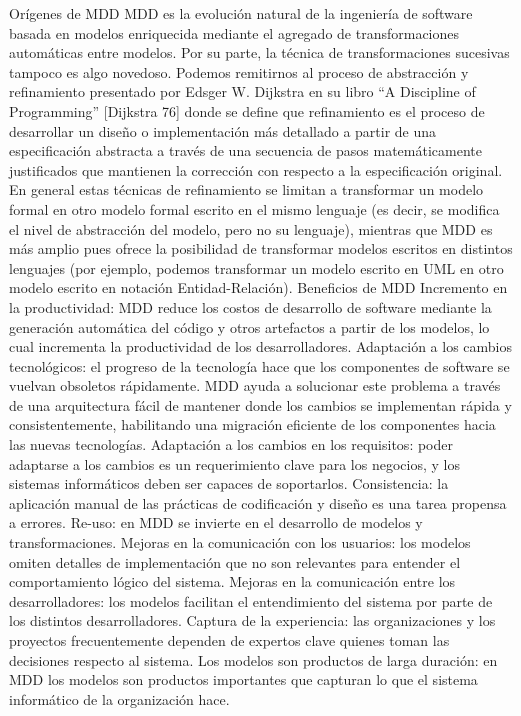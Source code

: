 \begin{enumerate}
Orígenes de MDD
MDD es la evolución natural de la ingeniería de software basada en modelos enriquecida mediante el agregado de transformaciones automáticas entre modelos. Por su parte, la técnica de transformaciones sucesivas tampoco es algo novedoso. Podemos remitirnos al proceso de abstracción y refinamiento presentado por Edsger W. Dijkstra en su libro “A Discipline of Programming” [Dijkstra 76] donde se define que refinamiento es el proceso de desarrollar un diseño o implementación más detallado a partir de una especificación abstracta a través de una secuencia de pasos matemáticamente justificados que mantienen la corrección con respecto a la especificación original.
En general estas técnicas de refinamiento se limitan a transformar un modelo formal en otro modelo formal escrito en el mismo lenguaje (es decir, se modifica el nivel de abstracción del modelo, pero no su lenguaje), mientras que MDD es más amplio pues ofrece la posibilidad de transformar modelos escritos en distintos lenguajes (por ejemplo, podemos transformar un modelo escrito en UML en otro modelo escrito en notación Entidad-Relación).
Beneficios de MDD
Incremento en la productividad: MDD reduce los costos de desarrollo de software mediante la generación automática del código y otros artefactos a partir de los modelos, lo cual incrementa la productividad de los desarrolladores.
Adaptación a los cambios tecnológicos: el progreso de la tecnología hace que los componentes de software se vuelvan obsoletos rápidamente. MDD ayuda a solucionar este problema a través de una arquitectura fácil de mantener donde los cambios se implementan rápida y consistentemente, habilitando una migración eficiente de los componentes hacia las nuevas tecnologías.
Adaptación a los cambios en los requisitos: poder adaptarse a los cambios es un requerimiento clave para los negocios, y los sistemas informáticos deben ser capaces de soportarlos.
Consistencia: la aplicación manual de las prácticas de codificación y diseño es una tarea propensa a errores.
Re-uso: en MDD se invierte en el desarrollo de modelos y transformaciones.
Mejoras en la comunicación con los usuarios: los modelos omiten detalles de implementación que no son relevantes para entender el comportamiento lógico del sistema.
Mejoras en la comunicación entre los desarrolladores: los modelos facilitan el entendimiento del sistema por parte de los distintos desarrolladores.
Captura de la experiencia: las organizaciones y los proyectos frecuentemente dependen de expertos clave quienes toman las decisiones respecto al sistema.
Los modelos son productos de larga duración: en MDD los modelos son productos importantes que capturan lo que el sistema informático de la organización hace.

\end{enumerate}
